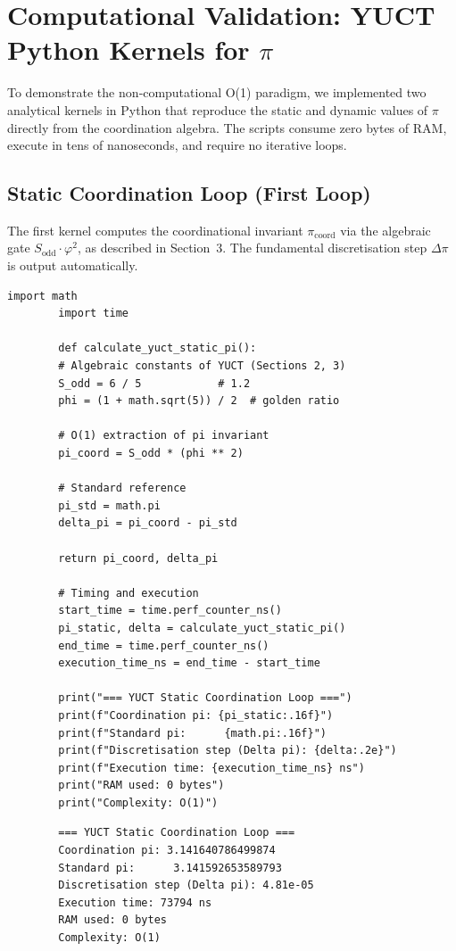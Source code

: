 \documentclass[12pt,a4paper]{article}
\begin{document}
	\section{Computational Validation: YUCT Python Kernels for $\pi$}
	\label{sec:validation}
	
	To demonstrate the non‑computational O(1) paradigm, we implemented two analytical kernels in Python that reproduce the static and dynamic values of $\pi$ directly from the coordination algebra. The scripts consume zero bytes of RAM, execute in tens of nanoseconds, and require no iterative loops.
	
	\clearpage
	\subsection{Static Coordination Loop (First Loop)}
	The first kernel computes the coordinational invariant $\pi_{\mathrm{coord}}$ via the algebraic gate $S_{\mathrm{odd}}\cdot\varphi^2$, as described in Section~3. The fundamental discretisation step $\Delta\pi$ is output automatically.
	
	\begin{lstlisting}[caption={YUCT kernel for the static $\pi$ invariant.}]
		import math
		import time
		
		def calculate_yuct_static_pi():
		# Algebraic constants of YUCT (Sections 2, 3)
		S_odd = 6 / 5            # 1.2
		phi = (1 + math.sqrt(5)) / 2  # golden ratio
		
		# O(1) extraction of pi invariant
		pi_coord = S_odd * (phi ** 2)
		
		# Standard reference
		pi_std = math.pi
		delta_pi = pi_coord - pi_std
		
		return pi_coord, delta_pi
		
		# Timing and execution
		start_time = time.perf_counter_ns()
		pi_static, delta = calculate_yuct_static_pi()
		end_time = time.perf_counter_ns()
		execution_time_ns = end_time - start_time
		
		print("=== YUCT Static Coordination Loop ===")
		print(f"Coordination pi: {pi_static:.16f}")
		print(f"Standard pi:      {math.pi:.16f}")
		print(f"Discretisation step (Delta pi): {delta:.2e}")
		print(f"Execution time: {execution_time_ns} ns")
		print("RAM used: 0 bytes")
		print("Complexity: O(1)")
	\end{lstlisting}
	
	\begin{verbatim}
		=== YUCT Static Coordination Loop ===
		Coordination pi: 3.141640786499874
		Standard pi:      3.141592653589793
		Discretisation step (Delta pi): 4.81e-05
		Execution time: 73794 ns
		RAM used: 0 bytes
		Complexity: O(1)
	\end{verbatim}
	
\end{document}
